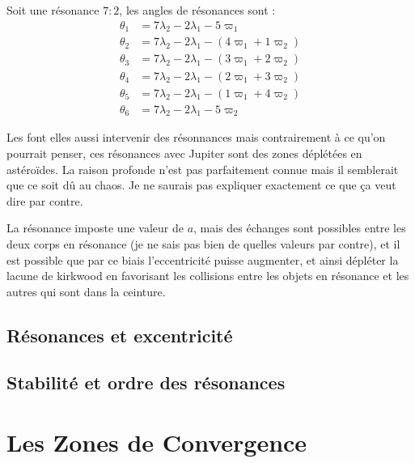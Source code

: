 \begin{exemple}
Soit une résonance $7:2$, les angles de résonances sont :
\begin{align*}
\theta_1 &= 7 \lambda_2 -2\lambda_1 - 5 \varpi_1\\
\theta_2 &= 7 \lambda_2 -2\lambda_1 - \left( 4 \varpi_1 + 1\varpi_2 \right)\\
\theta_3 &= 7 \lambda_2 -2\lambda_1 - \left( 3 \varpi_1 + 2\varpi_2 \right)\\
\theta_4 &= 7 \lambda_2 -2\lambda_1 - \left( 2 \varpi_1 + 3\varpi_2 \right)\\
\theta_5 &= 7 \lambda_2 -2\lambda_1 - \left( 1 \varpi_1 + 4\varpi_2 \right)\\
\theta_6 &= 7 \lambda_2 -2\lambda_1 - 5 \varpi_2
\end{align*}
\end{exemple}

\begin{remarque}
Les  font elles aussi intervenir des résonnances mais contrairement à ce qu'on pourrait penser, ces résonances avec Jupiter sont des zones déplétées en astéroïdes. La raison profonde n'est pas parfaitement connue mais il semblerait que ce soit dû au chaos. Je ne saurais pas expliquer exactement ce que ça veut dire par contre.

La résonance imposte une valeur de $a$, mais des échanges sont possibles entre les deux corps en résonance (je ne sais pas bien de quelles valeurs par contre), et il est possible que par ce biais l'eccentricité puisse augmenter, et ainsi dépléter la lacune de kirkwood en favorisant les collisions entre les objets en résonance et les autres qui sont dans la ceinture.
\end{remarque}
\subsection{Résonances et excentricité}
\subsection{Stabilité et ordre des résonances}

\section{Les Zones de Convergence}
